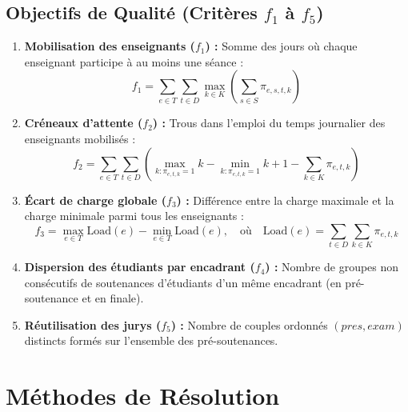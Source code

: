 \documentclass[10pt,a4paper]{article}
\begin{document}
\subsection{Objectifs de Qualité (Critères $f_1$ à $f_5$)}
\begin{enumerate}
    \item \textbf{Mobilisation des enseignants ($f_1$) :} Somme des jours où chaque enseignant participe à au moins une séance :
    $$f_1 = \sum_{e \in T} \sum_{t \in D} \max_{k \in K} \left( \sum_{s \in S} \pi_{e, s, t, k} \right)$$
    \item \textbf{Créneaux d'attente ($f_2$) :} Trous dans l'emploi du temps journalier des enseignants mobilisés :
    $$f_2 = \sum_{e \in T} \sum_{t \in D} \left( \max_{k: \pi_{e,t,k}=1} k - \min_{k: \pi_{e,t,k}=1} k + 1 - \sum_{k \in K} \pi_{e, t, k} \right)$$
    \item \textbf{Écart de charge globale ($f_3$) :} Différence entre la charge maximale et la charge minimale parmi tous les enseignants :
    $$f_3 = \max_{e \in T} \text{Load}(e) - \min_{e \in T} \text{Load}(e), \quad \text{où} \quad \text{Load}(e) = \sum_{t \in D} \sum_{k \in K} \pi_{e, t, k}$$
    \item \textbf{Dispersion des étudiants par encadrant ($f_4$) :} Nombre de groupes non consécutifs de soutenances d'étudiants d'un même encadrant (en pré-soutenance et en finale).
    \item \textbf{Réutilisation des jurys ($f_5$) :} Nombre de couples ordonnés $(pres, exam)$ distincts formés sur l'ensemble des pré-soutenances.
\end{enumerate}

\section{Méthodes de Résolution}
\end{document}

